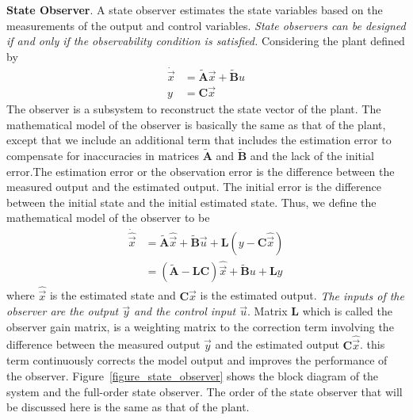 \documentclass[11pt,a4paper,oneside]{book}
\numberwithin{equation}{section}
\theoremstyle{it}
\theoremstyle{definition}
\begin{document}
\vspace{5mm}
\textbf{State Observer}. A state observer estimates the state variables based 
on the measurements of the output and control variables. \textit{State 
observers can be designed if and only if the observability condition is 
satisfied.}
Considering the plant defined by
\begin{equation} \label{state_observer_1}
	\begin{split}
		\dot{\vec x} & = \tilde{\mathbf{A}}\vec{x} + \tilde{\mathbf{B}}u \\[6pt]
		y & = \mathbf{C}\vec{x}
	\end{split}
\end{equation}
The observer is a subsystem to reconstruct the state vector of the plant. The 
mathematical model of the observer is basically the same as that of the plant, 
except that we include an additional term that includes the estimation error to 
compensate for inaccuracies in matrices $\tilde{\mathbf{A}}$ and 
$\tilde{\mathbf{B}}$ and the lack of the initial error.The estimation error or 
the observation error is the difference between the measured output and the 
estimated output. The initial error is the difference between the initial state 
and the initial estimated state. Thus, we define the mathematical model of the 
observer to be
\begin{equation} \label{state_observer_2}
	\begin{split}
		\dot{\hat{\vec{x}}} & = \tilde{\mathbf{A}}\hat{\vec x} + 
		\tilde{\mathbf{B}}\vec u + \mathbf{L}(y - \mathbf{C}\hat{\vec x}) 
		\\
		& = (\tilde{\mathbf{A}}-\mathbf{L}\mathbf{C})\hat{\vec x} + 
		\tilde{\mathbf{B}}u + \mathbf{L}y
	\end{split}
\end{equation}
where $\hat{\vec x}$ is the estimated state and $\mathbf{C}\hat{\vec x}$ is the 
estimated output. \textit{The inputs of the observer are the output $\vec y$ 
and the control input $\vec u$}. Matrix $\mathbf{L}$ which is called the 
observer gain matrix, is a weighting matrix to the correction term involving 
the difference between the measured output $\vec y$ and the estimated output 
$\mathbf{C}\hat{\vec x}$. this term continuously corrects the model output and 
improves 
the performance of the observer. Figure~\ref{figure_state_observer} shows the 
block diagram of the system and the full-order state observer.
The order of the state observer that will be discussed here is the same as that 
of the plant.
\end{document}

